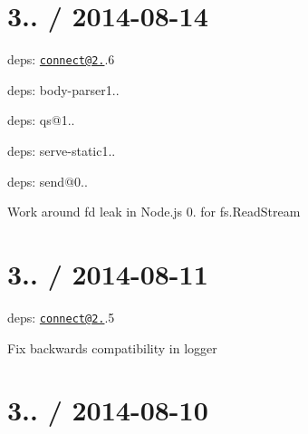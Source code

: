 {\ttfamily \section*{3.. / 2014-\/08-\/14 }}

{\ttfamily }

{\ttfamily 
\begin{DoxyItemize}
\item deps\+: \href{mailto:connect@2.25}{\tt connect@2.}.6
\begin{DoxyItemize}
\item deps\+: body-\/parser1..
\item deps\+: qs@1..
\item deps\+: serve-\/static1..
\end{DoxyItemize}
\item deps\+: send@0..
\begin{DoxyItemize}
\item Work around {\ttfamily fd} leak in Node.\+js 0. for {\ttfamily fs.\+Read\+Stream}
\end{DoxyItemize}
\end{DoxyItemize}}

{\ttfamily \section*{3.. / 2014-\/08-\/11 }}

{\ttfamily }

{\ttfamily 
\begin{DoxyItemize}
\item deps\+: \href{mailto:connect@2.25}{\tt connect@2.}.5
\begin{DoxyItemize}
\item Fix backwards compatibility in {\ttfamily logger}
\end{DoxyItemize}
\end{DoxyItemize}}

{\ttfamily \section*{3.. / 2014-\/08-\/10 }}

{\ttfamily }

